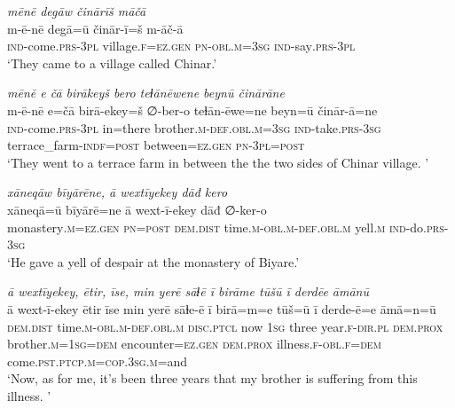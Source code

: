 \ea \label{DG.30}
\textit{mēnē degāw činārīš māčā} \\ 
\gll m-ē-nē degā=ū činār-ī=š m-āč-ā \\ 
 \textsc{ind-}come\textsc{.prs}\textsc{-3pl} village\textsc{\textsc{.f}}\textsc{=ez}\textsc{.gen} \textsc{pn}\textsc{-obl}\textsc{.m}\textsc{=3sg} \textsc{ind-}say\textsc{.prs}\textsc{-3pl} \\ 
\glt `They came to a village called Chinar.'
\z 
 
\ea \label{DG.31}
\textit{mēnē e čā birākeyš bero teɫānēwene beynū činārāne} \\ 
\gll m-ē-nē e=čā birā-ekey=š ∅-ber-o teɫān-ēwe=ne beyn=ū činār-ā=ne \\ 
 \textsc{ind-}come\textsc{.prs}\textsc{-3pl} in=there brother\textsc{.m}\textsc{-def}\textsc{.obl}\textsc{.m}\textsc{=3sg} \textsc{ind-}take\textsc{.prs}\textsc{-3sg} terrace\_farm\textsc{-indf}\textsc{=\textsc{post}} between\textsc{=ez}\textsc{.gen} \textsc{pn}\textsc{-3pl}\textsc{=\textsc{post}} \\ 
\glt `They went to a terrace farm in between the the two sides of Chinar village. '
\z 
 
\ea \label{DG.33}
\textit{xāneqāw bīyārēne, ā wextīyekey dāđ kero} \\ 
\gll xāneqā=ū bīyārē=ne ā wext-ī-ekey dāđ ∅-ker-o \\ 
 monastery\textsc{.m}\textsc{=ez}\textsc{.gen} \textsc{pn}\textsc{=\textsc{post}} \textsc{dem.dist} time\textsc{.m}\textsc{-obl}\textsc{.m}\textsc{-def}\textsc{.obl}\textsc{.m} yell\textsc{.m} \textsc{ind-}do\textsc{.prs}\textsc{-3sg} \\ 
\glt `He gave a yell of despair at the monastery of Biyare.'
\z 
 
\ea \label{DG.38}
\textit{ā wextīyekey, ētir, īse, min yerē sāɫē ī birāme tūšū ī derdēe āmānū} \\ 
\gll ā wext-ī-ekey ētir īse min yerē sāɫe-ē ī birā=m=e tūš=ū ī derde-ē=e āmā=n=ū \\ 
 \textsc{dem.dist} time\textsc{.m}\textsc{-obl}\textsc{.m}\textsc{-def}\textsc{.obl}\textsc{.m} \textsc{disc.ptcl} now \textsc{1sg} three year\textsc{\textsc{.f}}\textsc{-dir}\textsc{.pl} \textsc{dem.prox} brother\textsc{.m}\textsc{=1sg}\textsc{=dem} encounter\textsc{=ez}\textsc{.gen} \textsc{dem.prox} illness\textsc{\textsc{.f}}\textsc{-obl}\textsc{\textsc{.f}}\textsc{=dem} come\textsc{.pst}\textsc{.ptcp}\textsc{.m}\textsc{=cop}\textsc{.3sg}\textsc{.m}=and \\ 
\glt `Now, as for me, it’s been three years that my brother is suffering from this illness. '
\z 
 
